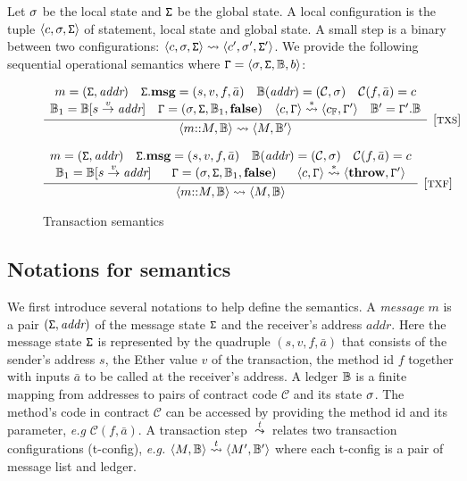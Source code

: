 Let $\sigma$ be the local state and $\mathtt{\Sigma}$ be the global state. A local configuration is the tuple $\langle c,\sigma,\mathtt{\Sigma} \rangle$ of statement, local state and global state. A small step is a binary between two configurations: $\langle c,\sigma,\mathtt{\Sigma} \rangle \leadsto \langle c',\sigma',\mathtt{\Sigma}' \rangle$. We provide the following sequential operational semantics where $\mathtt{\Gamma} = \langle \sigma,\mathtt{\Sigma},\mathbb{B},b \rangle$:

\begin{figure}
$$
\infer[{[\rname{txs}]}]{\conf{m{::}M,\chain} \leadsto \conf{M,\chain'}}
{
	\begin{array}{c}
	m = (\gstate,\textit{addr})~~~\gstate.\textbf{msg} = (s,v,f,\bar{a})~~~ \chain(\textit{addr}) = (\mathcal{C},\lstate)~~~\mathcal{C}(f,\bar{a}) = c\\
	\chain_1 = \chain[s \stackrel{v}{\rightarrow} \textit{addr}]~~~
	\cstate = (\lstate,\gstate,\chain_1,\textbf{false})~~~
	\conf{c,\cstate} \stackrel{*}{\leadsto} \conf{c_\mathbb{F},\cstate'}~~~
	\chain' = \cstate'.\chain
	\end{array}
}
$$

$$
\infer[{[\rname{txf}]}]{\conf{m{::}M,\chain} \leadsto \conf{M,\chain}}
{
	\begin{array}{c}
	m = (\gstate,\textit{addr})~~~\gstate.\textbf{msg} = (s,v,f,\bar{a})~~~ \chain(\textit{addr}) = (\mathcal{C},\lstate)~~~\mathcal{C}(f,\bar{a}) = c\\
	\chain_1 = \chain[s \stackrel{v}{\rightarrow} \textit{addr}]~~~~~
	\cstate = (\lstate,\gstate,\chain_1,\textbf{false})~~~~~
	\conf{c,\cstate} \stackrel{*}{\leadsto} \conf{\textbf{throw},\cstate'}
	\end{array}
}
$$
\caption{Transaction semantics}\label{fig:tx}
\end{figure}

\subsection{Notations for semantics}

We first introduce several notations to help define the semantics.  A \emph{message} $m$ is a pair $(\mathtt{\Sigma},\textit{addr})$ of the message state $\mathtt{\Sigma}$ and the receiver's address $\textit{addr}$. Here the message state $\mathtt{\Sigma}$ is represented by the quadruple $(s,v,f,\bar{a})$ that consists of the sender's address $s$, the Ether value $v$ of the transaction, the method id $f$ together with inputs $\bar{a}$ to be called at the receiver's address. A ledger $\mathbb{B}$ is a finite mapping from addresses to pairs of contract code $\mathcal{C}$ and its state $\sigma$. The method's code in contract $\mathcal{C}$ can be accessed by providing the method id and its parameter, \emph{e.g} $\mathcal{C}(f,\bar{a})$. A transaction step $\stackrel{t}{\leadsto}$ relates two transaction configurations (t-config), \emph{e.g.} $\langle M,\mathbb{B} \rangle \stackrel{t}{\leadsto} \langle M',\mathbb{B}' \rangle$ where each t-config is a pair of message list and ledger. 

